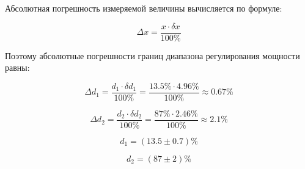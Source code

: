 Абсолютная погрешность измеряемой величины вычисляется по формуле:

\begin{equation}
	\Delta x = \frac{x \cdot \delta x}{100 \%}
\end{equation}

Поэтому абсолютные погрешности границ диапазона регулирования мощности равны:

\begin{displaymath}
	\Delta d_1 = \frac{d_1 \cdot \delta d_1}{100 \%} = \frac{13.5 \% \cdot 4.96 \%}{100 \%} \approx 0.67 \%
\end{displaymath}

\begin{displaymath}
	\Delta d_2 = \frac{d_2 \cdot \delta d_2}{100 \%} = \frac{87 \% \cdot 2.46 \%}{100 \%} \approx 2.1 \%
\end{displaymath}

\begin{displaymath}
	d_1 = (13.5 \pm 0.7)\%
\end{displaymath}

\begin{displaymath}
	d_2 = (87 \pm 2)\%
\end{displaymath}


